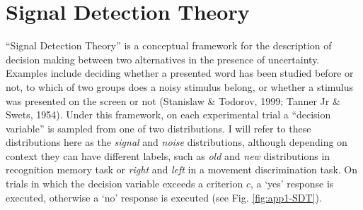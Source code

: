 \documentclass[12pt,twoside]{reedthesis}
\begin{document}
\appendix

\hypertarget{app1-SDT}{%
\chapter{Signal Detection Theory}\label{app1-SDT}}

``Signal Detection Theory'' is a conceptual framework for the description of decision making between two alternatives in the presence of uncertainty. Examples include deciding whether a presented word has been studied before or not, to which of two groups does a noisy stimulus belong, or whether a stimulus was presented on the screen or not (Stanislaw \& Todorov, 1999; Tanner Jr \& Swets, 1954). Under this framework, on each experimental trial a ``decision variable'' is sampled from one of two distributions. I will refer to these distributions here as the \emph{signal} and \emph{noise} distributions, although depending on context they can have different labels, such as \emph{old} and \emph{new} distributions in recognition memory task or \emph{right} and \emph{left} in a movement discrimination task. On trials in which the decision variable exceeds a criterion \(c\), a `yes' response is executed, otherwise a `no' response is executed (see Fig. \ref{fig:app1-SDT}).
\end{document}
